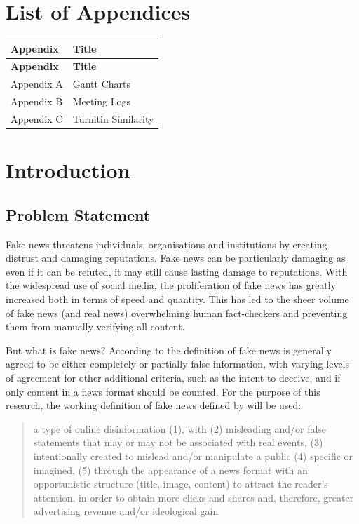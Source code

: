 \documentclass[stu,12pt,floatsintext,donotrepeattitle]{apa7}
\begin{document}
\section*{List of Appendices}
\endgroup

\begin{longtable}{p{3cm} p{10cm}}
\toprule
\textbf{Appendix} & \textbf{Title} \\
\midrule
\endfirsthead
\toprule
\textbf{Appendix} & \textbf{Title} \\
\midrule
\endhead
\bottomrule
\endlastfoot
Appendix A & Gantt Charts \\
Appendix B & Meeting Logs \\
Appendix C & Turnitin Similarity \\
\end{longtable}

\clearpage
{}
\setcounter{page}{1}
\section{Introduction}

\subsection{Problem Statement}
Fake news threatens individuals, organisations and institutions by creating distrust and damaging reputations. Fake news can be particularly damaging as even if it can be refuted, it may still cause lasting damage to reputations. With the widespread use of social media, the proliferation of fake news has greatly increased both in terms of speed and quantity. This has led to the sheer volume of fake news (and real news) overwhelming human fact-checkers and preventing them from manually verifying all content. 

But what is fake news? According to \textcite{definition} the definition of fake news is generally agreed to be either completely or partially false information, with varying levels of agreement for other additional criteria, such as the intent to deceive, and if only content in a news format should be counted. For the purpose of this research, the working definition of fake news defined by \textcite{definition} will be used: 

\begin{quote}
    a type of online disinformation (1), with (2) misleading
and/or false statements that may or may not be associated with real events, (3) intentionally
created to mislead and/or manipulate a public (4) specific or imagined, (5) through the
appearance of a news format with an opportunistic structure (title, image, content) to attract
the reader’s attention, in order to obtain more clicks and shares and, therefore, greater
advertising revenue and/or ideological gain \textcite{definition}
\end{quote} 
\end{document}
